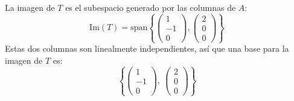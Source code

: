 \begin{prob}
\begin{myproof}
La imagen de $T$ es el subespacio generado por las columnas de $A$:
\[
\text{Im}(T) = \text{span}\left\{ \begin{pmatrix}1\\-1\\0\end{pmatrix}, \begin{pmatrix}2\\0\\0\end{pmatrix} \right\}
\]
Estas dos columnas son linealmente independientes, así que una base para la imagen de $T$ es:
\[
\left\{ \begin{pmatrix}1\\-1\\0\end{pmatrix},\ \begin{pmatrix}2\\0\\0\end{pmatrix} \right\}
\]
\end{myproof}
\end{prob}


